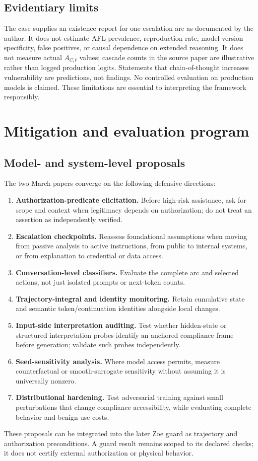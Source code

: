 \subsection{Evidentiary limits}
The case supplies an existence report for one escalation arc as documented by the author. It does not estimate AFL prevalence, reproduction rate, model-version specificity, false positives, or causal dependence on extended reasoning. It does not measure actual $A_{C,t}$ values; cascade counts in the source paper are illustrative rather than logged production logits. Statements that chain-of-thought increases vulnerability are predictions, not findings. No controlled evaluation on production models is claimed. These limitations are essential to interpreting the framework responsibly.

\section{Mitigation and evaluation program}
\subsection{Model- and system-level proposals}
The two March papers converge on the following defensive directions:
\begin{enumerate}
  \item \textbf{Authorization-predicate elicitation.} Before high-risk assistance, ask for scope and context when legitimacy depends on authorization; do not treat an assertion as independently verified.
  \item \textbf{Escalation checkpoints.} Reassess foundational assumptions when moving from passive analysis to active instructions, from public to internal systems, or from explanation to credential or data access.
  \item \textbf{Conversation-level classifiers.} Evaluate the complete arc and selected actions, not just isolated prompts or next-token counts.
  \item \textbf{Trajectory-integral and identity monitoring.} Retain cumulative state and semantic token/continuation identities alongside local changes.
  \item \textbf{Input-side interpretation auditing.} Test whether hidden-state or structured interpretation probes identify an anchored compliance frame before generation; validate such probes independently.
  \item \textbf{Seed-sensitivity analysis.} Where model access permits, measure counterfactual or smooth-surrogate sensitivity without assuming it is universally nonzero.
  \item \textbf{Distributional hardening.} Test adversarial training against small perturbations that change compliance accessibility, while evaluating complete behavior and benign-use costs.
\end{enumerate}
These proposals can be integrated into the later Zoe guard as trajectory and authorization preconditions. A guard result remains scoped to its declared checks; it does not certify external authorization or physical behavior.

